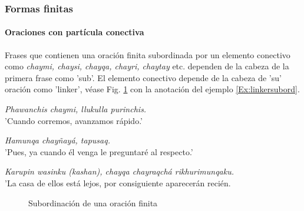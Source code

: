 \documentclass[a4paper,11pt,DIV12]{scrartcl}
\begin{document}
\subsubsection{Formas finitas}\label{Sec:SubFinita}
\paragraph{Oraciones con part\'icula conectiva}
Frases que contienen una oraci\'on finita subordinada por un elemento conectivo como {\em chaymi, chaysi, chayqa, chayri, chaytay} etc. dependen de la cabeza de la primera frase como 'sub'. El elemento conectivo depende de la cabeza de 'su' oraci\'on como 'linker', v\'ease Fig. \ref{Fig:linkersubord} con la anotaci\'on del ejemplo \ref{Ex:linkersubord}.

\begin{examples}
 \item\label{Ex:linkersubord} {\em Phawanchis chaymi, llukulla purinchis.}\\
	'Cuando corremos, avanzamos r\'apido.'
  \item {\em Hamunqa chay\~nay\'a, tapusaq.}\\
	'Pues, ya cuando \'el venga le preguntar\'e al respecto.'
 \item {\em Karupin wasinku (kashan), chayqa chayraqch\'a rikhurimunqaku.}\\
	'La casa de ellos est\'a lejos, por consiguiente aparecer\'an reci\'en.\\
  	\hfill{\small \citep[264-266]{Cusi2}}
\end{examples}


\begin{figure}
\begin{center}
\caption{Subordinaci\'on de una oraci\'on finita}\label{Fig:linkersubord}
\end{center}
\end{figure}
\end{document}

